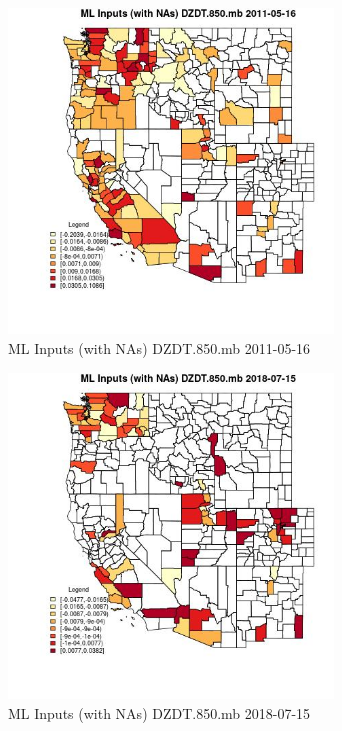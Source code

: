 \begin{figure} 
\centering  
\includegraphics[width=0.77\textwidth]{Code_Outputs/Report_ML_input_PM25_Step4_part_e_de_duplicated_aves_compiled_2019-05-20wNAs_CountyDZDT850mbMean2011-05-16.jpg} 
\caption{\label{fig:Report_ML_input_PM25_Step4_part_e_de_duplicated_aves_compiled_2019-05-20wNAsCountyDZDT850mbMean2011-05-16}ML Inputs (with NAs) DZDT.850.mb 2011-05-16} 
\end{figure} 
 

\begin{figure} 
\centering  
\includegraphics[width=0.77\textwidth]{Code_Outputs/Report_ML_input_PM25_Step4_part_e_de_duplicated_aves_compiled_2019-05-20wNAs_CountyDZDT850mbMean2018-07-15.jpg} 
\caption{\label{fig:Report_ML_input_PM25_Step4_part_e_de_duplicated_aves_compiled_2019-05-20wNAsCountyDZDT850mbMean2018-07-15}ML Inputs (with NAs) DZDT.850.mb 2018-07-15} 
\end{figure} 
 

